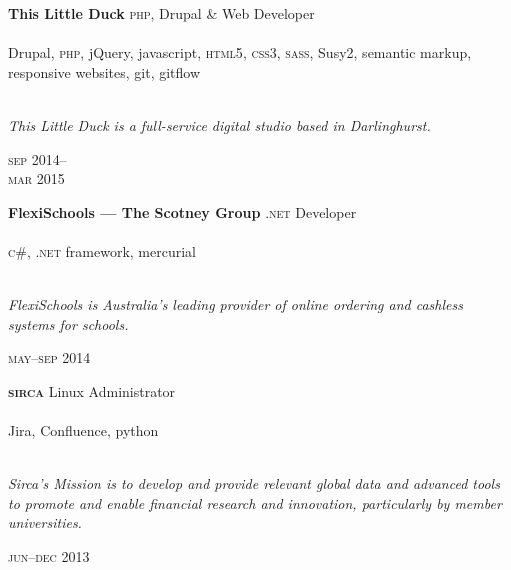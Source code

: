 \begin{minipage}[t]{0.70\textwidth}
\textbf{This Little Duck}\phantom{..} \textsc{php}, Drupal \& Web Developer \\
\\
Drupal, \textsc{php}, jQuery, javascript, \textsc{html5}, 
\textsc{css3}, \textsc{sass}, Susy2, semantic markup, responsive websites,
git, gitflow
\\
\\
{\small
\textit{This Little Duck is a full-service digital studio based in Darlinghurst.}
\par}
\end{minipage}
\begin{minipage}[t]{0.30\textwidth}
{
\hfill \textsc{sep} 2014--\\ 
\hspace*{0pt} \hfill \textsc{mar} 2015
\par
}
\end{minipage}

\vspace{0.2in}

\begin{minipage}[t]{0.7\textwidth}
\textbf{FlexiSchools --- The Scotney Group}\phantom{..} \textsc{.net} Developer \\
\\
\textsc{c\#}, \textsc{.net} framework, mercurial
\\
\\
{\small
\textit{FlexiSchools is Australia’s leading provider of online ordering and cashless systems for schools.}
\par}
\end{minipage}
\begin{minipage}[t]{0.30\textwidth}
\hfill \textsc{may}--\textsc{sep} 2014\\
\end{minipage}

\vspace{0.2in}

\begin{minipage}[t]{0.7\textwidth}
\textbf{\textsc{sirca}}\phantom{..} Linux Administrator \\
\\
Jira, Confluence, python
\\
\\
{\small
\textit{Sirca’s Mission is to develop and provide relevant global data and advanced tools to promote and enable financial research and innovation, particularly by member universities.}
\par}
\end{minipage}
\begin{minipage}[t]{0.3\textwidth}
\hfill \textsc{jun}--\textsc{dec} 2013\\
\end{minipage}

